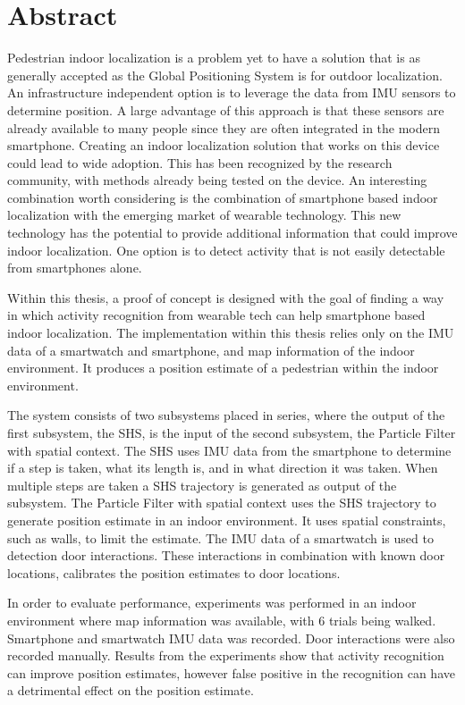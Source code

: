 %
\chapter*{Abstract}%

Pedestrian indoor localization is a problem  yet to have a solution that is as generally accepted as the Global Positioning System is for outdoor localization. An infrastructure independent option is to leverage the data from \ac{IMU} sensors to determine position. A large advantage of this approach is that these sensors are already available to many people since they are often integrated in the modern smartphone. Creating an indoor localization solution that works on this device could lead to wide adoption. This has been recognized by the research community, with methods already being tested on the device. An interesting combination worth considering is the combination of smartphone based indoor localization with the emerging market of wearable technology. This new technology has the potential to provide additional information that could improve indoor localization. One option is to detect activity that is not easily detectable from smartphones alone.

Within this thesis, a proof of concept is designed with the goal of finding a way in which activity recognition from wearable tech can help smartphone based indoor localization.
The implementation within this thesis relies only on the \ac{IMU} data of a smartwatch and smartphone, and map information of the indoor environment. It produces a position estimate of a pedestrian within the indoor environment. \par 

The system consists of two subsystems placed in series, where the output of the first subsystem, the \ac{SHS}, is the input of the second subsystem, the Particle Filter with  spatial context. The \ac{SHS} uses \ac{IMU} data from the smartphone to determine if a step is taken, what its length is, and in what direction it was taken. When multiple steps are taken a \ac{SHS} trajectory is generated as output of the subsystem.
The Particle Filter with spatial context uses the \ac{SHS} trajectory to generate position estimate in an indoor environment. It uses spatial constraints, such as walls, to limit the estimate. The \ac{IMU} data of a smartwatch is used to detection door interactions. These interactions in combination with known door locations, calibrates the position estimates to door locations. \par 

In order to evaluate performance, experiments was performed in an indoor environment where map information was available, with 6 trials being walked. Smartphone and smartwatch {IMU} data was recorded. Door interactions were also recorded manually.
Results from the experiments show that activity recognition can improve position estimates, however false positive in the recognition can have a detrimental effect on the position estimate.

